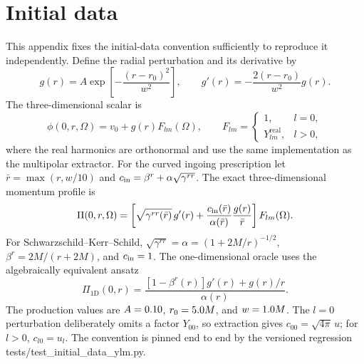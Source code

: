 \documentclass[
  aps,
  prd,
  reprint,
  superscriptaddress,
  nofootinbib,
  longbibliography
]{revtex4-2}
\begin{document}
\noindent{}

\appendix

\section{Initial data}
\label{app:initial-data}

This appendix fixes the initial-data convention sufficiently to reproduce it
independently.  Define the radial perturbation and its derivative by
\begin{equation}
  g(r)=A\exp\!\left[-\frac{(r-r_0)^2}{w^2}\right],
  \qquad
  g'(r)=-\frac{2(r-r_0)}{w^2}g(r).
  \label{eq:initial-gaussian}
\end{equation}
The three-dimensional scalar is
\begin{equation}
  \phi(0,r,\Omega)=v_0+g(r)F_{lm}(\Omega),
  \qquad
  F_{lm}=\begin{cases}
    1, & l=0,\\
    Y_{lm}^{\mathrm{real}}, & l>0,
  \end{cases}
  \label{eq:initial-field}
\end{equation}
where the real harmonics are orthonormal and use the same implementation as
the multipolar extractor.  For the curved ingoing prescription let
$\bar r=\max(r,w/10)$ and
$c_{\rm in}=\beta^r+\alpha\sqrt{\gamma^{rr}}$.  The exact three-dimensional
momentum profile is
\begin{equation}
  \Pi(0,r,\Omega)=
  \left[
    \sqrt{\gamma^{rr}(\bar r)}\,g'(r)
    +\frac{c_{\rm in}(\bar r)}{\alpha(\bar r)}
     \frac{g(r)}{\bar r}
  \right]F_{lm}(\Omega).
  \label{eq:initial-momentum-3d}
\end{equation}
For Schwarzschild--Kerr--Schild,
$\sqrt{\gamma^{rr}}=\alpha=(1+2M/r)^{-1/2}$,
$\beta^r=2M/(r+2M)$, and $c_{\rm in}=1$.  The one-dimensional oracle uses
the algebraically equivalent ansatz
\begin{equation}
  \Pi_{\mathrm{1D}}(0,r)=
  \frac{[1-\beta^r(r)]g'(r)+g(r)/r}{\alpha(r)}.
  \label{eq:initial-momentum-1d}
\end{equation}
The production values are $A=0.10$, $r_0=5.0 M$, and
$w=1.0 M$.  The $l=0$ perturbation deliberately omits a factor
$Y_{00}$, so extraction gives $c_{00}=\sqrt{4\pi}\,u$; for $l>0$,
$c_{l0}=u_l$.
The convention is pinned end to end by the versioned regression
tests/test\_initial\_data\_ylm.py.
\end{document}
